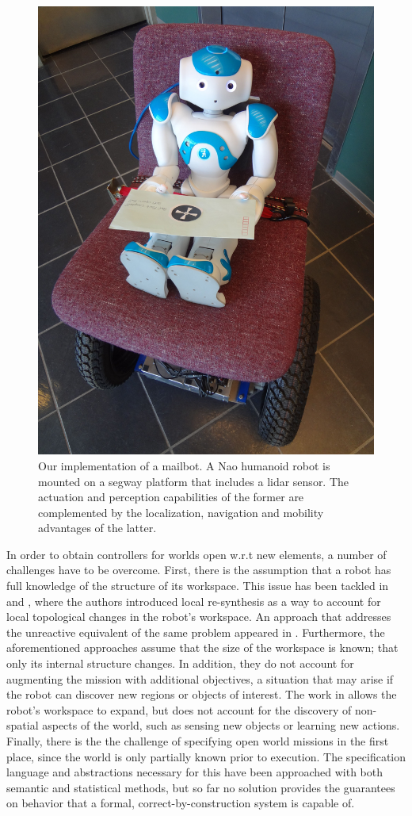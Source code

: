 \begin{figure}[ht]
	\centering
	\includegraphics[width=0.7\columnwidth, clip]{./img/mailbot.jpg}
	\caption{Our implementation of a mailbot. A Nao humanoid robot is mounted on a segway platform that includes a lidar sensor. The actuation and perception capabilities of the former are complemented by the localization, navigation and mobility advantages of the latter.}
	\label{Fig:mailbot}
\end{figure}

In order to obtain controllers for worlds open w.r.t new elements, a number of challenges have to be overcome. 
First, there is the assumption that a robot has full knowledge of the structure of its workspace. This issue has been tackled in \cite{MurrayICRA2012} and \cite{MurrayICRA2013a}, where the authors introduced local re-synthesis as a way to account for local topological changes in the robot's workspace. 
An approach that addresses the unreactive equivalent of the same problem appeared in \cite{Dimos2013ICRA}. 
Furthermore, the aforementioned approaches assume that the size of the workspace is known; that only its internal structure changes. In addition, they do not account for augmenting the mission with additional objectives, a situation that may arise if the robot can discover new regions or objects of interest. 
The work in \cite{BingxinRSS2012} allows the robot's workspace to expand, but does not account for the discovery of non-spatial aspects of the world, such as sensing new objects or learning new actions.
Finally, there is the the challenge of specifying open world missions in the first place, since the world is only partially known prior to execution. The specification language and abstractions necessary for this have been approached with both semantic \cite{Joshi2012, MatthiasAI2010} and statistical \cite{Tellex2011} methods, but so far no solution provides the guarantees on behavior that a formal, correct-by-construction system is capable of. 

